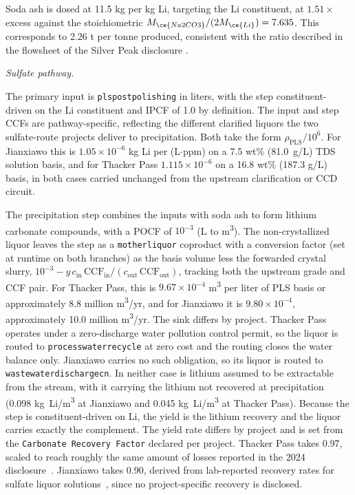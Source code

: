 \documentclass{article}
\renewcommand\_{\textunderscore\allowbreak}
\begin{document}
Soda ash is dosed at 11.5 kg  per kg Li, targeting the Li constituent, at $1.51\times$ excess against the stoichiometric $M_{\ce{Na2CO3}}/(2M_{\ce{Li}}) = 7.635$. This corresponds to 2.26 t  per tonne  produced, consistent with the ratio described in the flowsheet of the Silver Peak disclosure \cite{srkconsultingSECTechnicalReport2023a}.
 
\medskip
\noindent\textit{Sulfate pathway.}\quad
 
The primary input is \texttt{pls\_post\_polishing} in liters, with the step constituent-driven on the Li constituent and IPCF of 1.0 by definition. The input and step CCFs are pathway-specific, reflecting the different clarified liquors the two sulfate-route projects deliver to precipitation. Both take the form $\rho_\text{PLS}/10^6$. For Jianxiawo this is $1.05 \times 10^{-6}$ kg Li per (L$\cdot$ppm) on a 7.5 wt\% (81.0~g/L) TDS solution basis, and for Thacker Pass $1.115 \times 10^{-6}$ on a 16.8 wt\% (187.3 g/L) basis, in both cases carried unchanged from the upstream clarification or CCD circuit.

The precipitation step combines the inputs with soda ash to form lithium carbonate compounds, with a POCF of $10^{-3}$ (L to \si{m^3}). The non-crystallized liquor leaves the step as a \texttt{mother\_liquor} coproduct with a conversion factor (set at runtime on both branches) as the basis volume less the forwarded crystal slurry, $10^{-3} - y \, c_\text{in}\,\text{CCF}_\text{in} / (c_\text{out}\,\text{CCF}_\text{out})$, tracking both the upstream grade and CCF pair. For Thacker Pass, this is $9.67 \times 10^{-4}$ \si{m^3} per liter of PLS basis or approximately 8.8 million \si{m^3/yr}, and for Jianxiawo it is $9.80 \times 10^{-4}$, approximately 10.0 million \si{m^3/yr}. The sink differs by project. Thacker Pass operates under a zero-discharge water pollution control permit, so the liquor is routed to \texttt{process\_water\_recycle} at zero cost and the routing closes the water balance only. Jianxiawo carries no such obligation, so its liquor is routed to \texttt{wastewater\_discharge\_cn}. In neither case is lithium assumed to be extractable from the stream, with it carrying the lithium not recovered at precipitation (0.098 \si{kg~Li/m^3} at Jianxiawo and 0.045 \si{kg~Li/m^3} at Thacker Pass). Because the step is constituent-driven on Li, the yield is the lithium recovery and the liquor carries exactly the complement. The yield rate differs by project and is set from the \texttt{Carbonate Recovery Factor} declared per project. Thacker Pass takes 0.97, scaled to reach roughly the same amount of losses reported in the 2024 disclosure~\cite{sgscanadaincSK1300Technical2024}. Jianxiawo takes 0.90, derived from lab-reported recovery rates for sulfate liquor solutions~\cite{liuProcessAnalysisStudy2021}, since no project-specific recovery is disclosed. 
 
\end{document}
